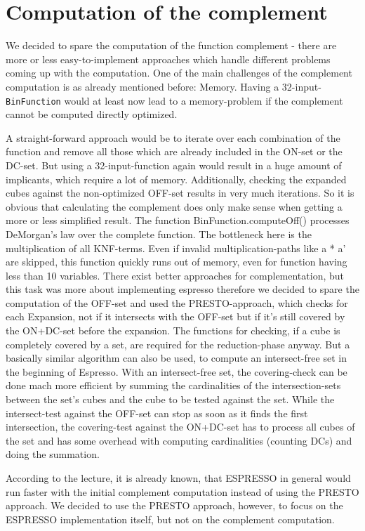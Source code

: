 \documentclass[colorback,accentcolor=tud1c,11pt]{tudreport}
\newcommand\code[1]{\texttt{#1}}
\begin{document}
  \section{Computation of the complement}
  We decided to spare the computation of the function complement - there are more or less easy-to-implement approaches which handle different problems coming up with the computation. One of the main challenges of the complement computation is as already mentioned before: Memory. Having a 32-input-\code{BinFunction} would at least now lead to a memory-problem if the complement cannot be computed directly optimized.
  \par
  A straight-forward approach would be to iterate over each combination of the function and remove all those which are already included in the ON-set or the DC-set. But using a 32-input-function again would result in a huge amount of implicants, which require a lot of memory. Additionally, checking the expanded cubes against the non-optimized OFF-set results in very much iterations. So it is obvious that calculating the complement does only make sense when getting a more or less simplified result. The function BinFunction.computeOff() processes DeMorgan's law over the complete function. The bottleneck here is the multiplication of all KNF-terms. Even if invalid multiplication-paths like a * a' are skipped, this function quickly runs out of memory, even for function having less than 10 variables. There exist better approaches for complementation, but this task was more about implementing espresso therefore we decided to spare the computation of the OFF-set and used the PRESTO-approach, which checks for each Expansion, not if it intersects with the OFF-set but if it's still covered by the ON+DC-set before the expansion. The functions for checking, if a cube is completely covered by a set, are required for the reduction-phase anyway. But a basically similar algorithm can also be used, to compute an intersect-free set in the beginning of Espresso. With an intersect-free set, the covering-check can be done mach more efficient by summing the cardinalities of the intersection-sets between the set's cubes and the cube to be tested against the set. While the intersect-test against the OFF-set can stop as soon as it finds the first intersection, the covering-test against the ON+DC-set has to process all cubes of the set and has some overhead with computing cardinalities (counting DCs) and doing the summation.
  \par
  According to the lecture, it is already known, that ESPRESSO in general would run faster with the initial complement computation instead of using the PRESTO approach. We decided to use the PRESTO approach, however, to focus on the ESPRESSO implementation itself, but not on the complement computation.
\end{document}
